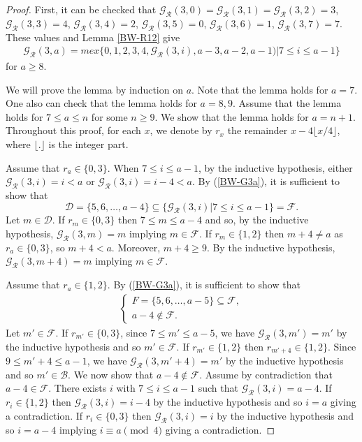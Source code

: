 \documentclass[12pt]{amsart}
\theoremstyle{plain}
\theoremstyle{definition}
\theoremstyle{remark}
\begin{document}
\begin{proof}
First, it can be checked that ${\mathcal{G}}_{\mathcal{R}}(3,0) = {\mathcal{G}}_{\mathcal{R}}(3,1) = {\mathcal{G}}_{\mathcal{R}}(3,2) = 3$, ${\mathcal{G}}_{\mathcal{R}}(3,3) = 4$,
${\mathcal{G}}_{\mathcal{R}}(3,4) = 2$, ${\mathcal{G}}_{\mathcal{R}}(3,5) = 0$, ${\mathcal{G}}_{\mathcal{R}}(3,6) = 1$, ${\mathcal{G}}_{\mathcal{R}}(3,7) = 7$. These values and Lemma \ref{BW-R12} give
\begin{align} \label{BW-G3a}
{\mathcal{G}}_{\mathcal{R}}(3,a) = mex\{0,1,2,3,4,{\mathcal{G}}_{\mathcal{R}}(3,i),a-3,a-2,a-1) | 7 \leq i \leq a-1 \}
\end{align}
for $a \geq 8$.

We will prove the lemma by induction on $a$. Note that the lemma holds for $a = 7$. One also can check that the lemma holds for $a = 8,9$. Assume that the lemma holds for $7 \leq a \leq n$ for some $n \geq 9$. We show that the lemma holds for $a = n+1$. Throughout this proof, for each $x$, we denote by $r_x$ the remainder $x - 4\lfloor x/4 \rfloor$, where $\lfloor . \rfloor$ is the integer part.

Assume that $r_a \in \{0,3\}$. When $7 \leq i \leq a-1$, by the inductive hypothesis, either ${\mathcal{G}}_{\mathcal{R}}(3,i) = i < a$ or ${\mathcal{G}}_{\mathcal{R}}(3,i) = i-4 < a$. By (\ref{BW-G3a}), it is sufficient to show that
\[{\mathcal{D}} = \{5,6,\ldots, a-4\} \subseteq \{{\mathcal{G}}_{\mathcal{R}}(3,i) | 7 \leq i \leq a-1\} = {\mathcal{F}}.\]
Let $m \in {\mathcal{D}}$. If $r_m \in \{0,3\}$ then $7 \leq m \leq a-4$ and so, by the inductive hypothesis, ${\mathcal{G}}_{\mathcal{R}}(3,m) = m$ implying $m \in {\mathcal{F}}$. If $r_m \in \{1,2\}$ then $m+4 \neq a$ as $r_a \in \{0,3\}$, so $m+4 < a$. Moreover, $m+4 \geq 9$. By the inductive hypothesis, ${\mathcal{G}}_{\mathcal{R}}(3,m+4) = m$ implying $m \in {\mathcal{F}}$.

Assume that $r_a \in \{1,2\}$. By (\ref{BW-G3a}), it is sufficient to show that
\begin{align*}
\begin{cases}
F = \{5,6,\ldots, a-5\} \subseteq {\mathcal{F}},\\
a-4 \notin {\mathcal{F}}.
\end{cases}
\end{align*}
Let $m' \in {\mathcal{F}}$. If $r_{m'} \in \{0,3\}$, since $7 \leq m' \leq a-5$, we have ${\mathcal{G}}_{\mathcal{R}}(3,m') = m'$ by the inductive hypothesis and so $m' \in {\mathcal{F}}$. If $r_{m'} \in \{1,2\}$ then $r_{m'+4} \in \{1,2\}$. Since $9 \leq m'+4 \leq a-1$, we have ${\mathcal{G}}_{\mathcal{R}}(3,m'+4) = m'$ by the inductive hypothesis and so $m' \in {\mathcal{B}}$. We now show that $a-4 \notin {\mathcal{F}}$. Assume by contradiction that $a-4 \in {\mathcal{F}}$. There exists $i$ with $7 \leq i \leq a-1$ such that ${\mathcal{G}}_{\mathcal{R}}(3,i) = a-4$. If $r_i \in \{1,2\}$ then ${\mathcal{G}}_{\mathcal{R}}(3,i) = i-4$ by the inductive hypothesis and so $i=a$ giving a contradiction. If $r_i \in \{0,3\}$ then ${\mathcal{G}}_{\mathcal{R}}(3,i) = i$ by the inductive hypothesis and so $i = a-4$ implying $i \equiv a \pmod 4$ giving a contradiction.
\end{proof}
\end{document}
